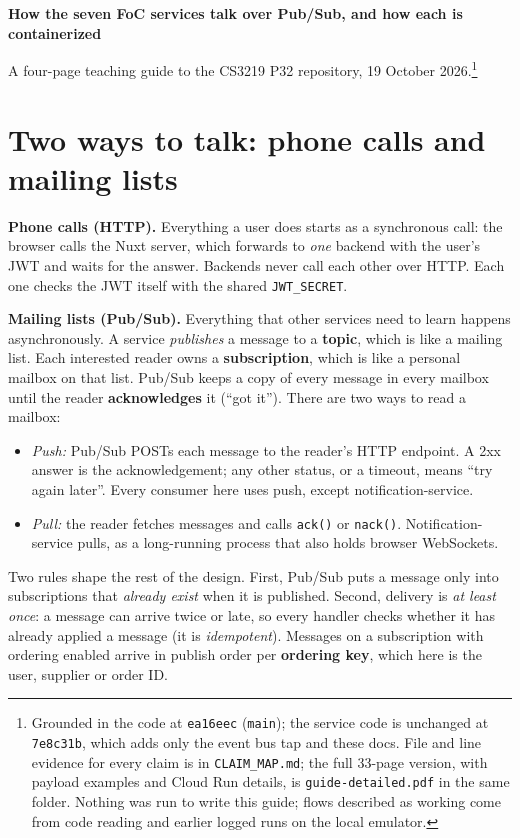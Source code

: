 \documentclass[11pt,a4paper]{article}
\newcommand{\code}[1]{\nolinkurl{#1}}
\begin{document}
{\raggedright\Large\bfseries\color{accent} How the seven FoC services talk over Pub/Sub, and how each is containerized\par}
\vspace{2pt}
{\small A four-page teaching guide to the CS3219 P32 repository, 19 October 2026.\footnote{Grounded
in the code at \code{ea16eec} (\code{main}); the service code is unchanged at \code{7e8c31b}, which adds
only the event bus tap and these docs. File and line evidence for every claim is in
\code{CLAIM_MAP.md}; the full 33-page version, with payload examples and Cloud Run details, is
\code{guide-detailed.pdf} in the same folder. Nothing was run to write this guide; flows described as
working come from code reading and earlier logged runs on the local emulator.}\par}

\section{Two ways to talk: phone calls and mailing lists}

\textbf{Phone calls (HTTP).} Everything a user does starts as a synchronous call: the browser
calls the Nuxt server, which forwards to \emph{one} backend with the user's JWT and waits for the
answer. Backends never call each other over HTTP. Each one checks the JWT itself with the shared
\code{JWT_SECRET}.

\textbf{Mailing lists (Pub/Sub).} Everything that other services need to learn happens
asynchronously. A service \emph{publishes} a message to a \textbf{topic}, which is like a mailing
list. Each interested reader owns a \textbf{subscription}, which is like a personal mailbox on that
list. Pub/Sub keeps a copy of every message in every mailbox until the reader
\textbf{acknowledges} it (``got it''). There are two ways to read a mailbox:
\begin{itemize}
  \item \emph{Push:} Pub/Sub POSTs each message to the reader's HTTP endpoint. A 2xx answer is the
  acknowledgement; any other status, or a timeout, means ``try again later''. Every consumer here
  uses push, except notification-service.
  \item \emph{Pull:} the reader fetches messages and calls \code{ack()} or \code{nack()}.
  Notification-service pulls, as a long-running process that also holds browser WebSockets.
\end{itemize}
Two rules shape the rest of the design. First, Pub/Sub puts a message only into subscriptions that
\emph{already exist} when it is published. Second, delivery is \emph{at least once}: a message can
arrive twice or late, so every handler checks whether it has already applied a message (it is
\emph{idempotent}). Messages on a subscription with ordering enabled arrive in publish order per
\textbf{ordering key}, which here is the user, supplier or order ID.
\end{document}
